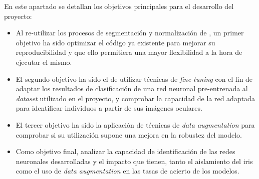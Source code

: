  \label{capitulo2}

En este apartado se detallan los objetivos principales para el desarrollo del proyecto:
\begin{itemize}
    \item Al re-utilizar los procesos de segmentación y normalización de \cite{tfg_iris_2020}, un primer objetivo ha sido optimizar el código ya existente para 
    mejorar su reproducibilidad y que ello permitiera una mayor flexibilidad a la hora de ejecutar el mismo.
    \item El segundo objetivo ha sido el de utilizar técnicas de \textit{fine-tuning} con el fin de adaptar los resultados de clasificación de una red neuronal pre-entrenada al \textit{dataset} utilizado en el proyecto, y comprobar la capacidad de la red adaptada para identificar individuos a partir de sus imágenes oculares.
    \item El tercer objetivo ha sido la aplicación de técnicas de \textit{data augmentation} para comprobar si su utilización supone una mejora en la robustez del modelo.
    \item Como objetivo final, analizar la capacidad de identificación de las redes neuronales desarrolladas y el impacto que tienen, tanto el aislamiento del iris como el uso de \textit{data augmentation} en las tasas de acierto de los modelos.                                                                                                                                                                                                           
\end{itemize}

